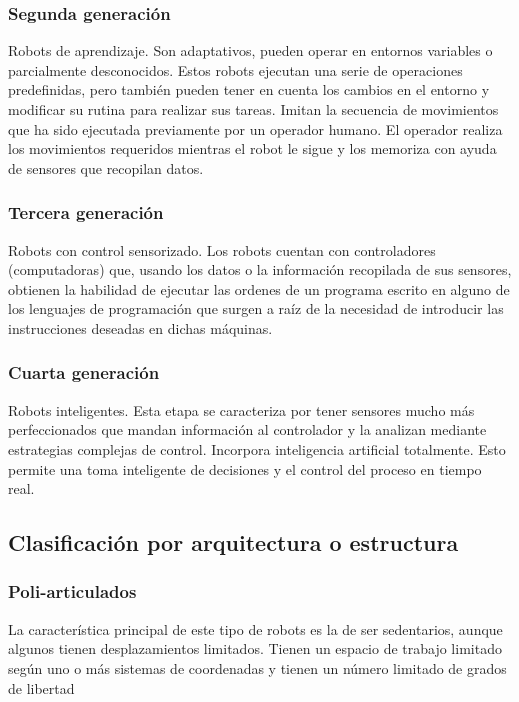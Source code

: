         \subsubsection{Segunda generación}
            Robots de aprendizaje. Son adaptativos, pueden operar en entornos variables o parcialmente desconocidos. Estos robots ejecutan una serie de operaciones predefinidas, pero también pueden tener en cuenta los cambios en el entorno y modificar su rutina para realizar sus tareas. Imitan la secuencia de movimientos que ha sido ejecutada previamente por un operador humano. El operador realiza los movimientos requeridos mientras el robot le sigue y los memoriza con ayuda de sensores que recopilan datos.
        \subsubsection{Tercera generación}
            Robots con control sensorizado. Los robots cuentan con controladores (computadoras) que, usando los datos o la información recopilada de sus sensores, obtienen la habilidad de ejecutar las ordenes de un programa escrito en alguno de los lenguajes de programación que surgen a raíz de la necesidad de introducir las instrucciones deseadas en dichas máquinas. 
        \subsubsection{Cuarta generación}
            Robots inteligentes. Esta etapa se caracteriza por tener sensores mucho más perfeccionados que mandan información al controlador y la analizan mediante estrategias complejas de control. Incorpora inteligencia artificial totalmente. Esto permite una toma inteligente de decisiones y el control del proceso en tiempo real.

        \newpage
        
    \subsection{Clasificación por arquitectura o estructura}
        
        \subsubsection{Poli-articulados}
        La característica principal de este tipo de robots es la de ser sedentarios, aunque algunos tienen desplazamientos limitados. Tienen un espacio de trabajo limitado según uno o más sistemas de coordenadas y tienen un número limitado de grados de libertad
        
